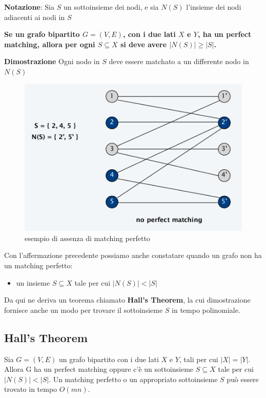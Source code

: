 \textbf{Notazione}: Sia $S$ un sottoinsieme dei nodi, e sia $N(S)$
l'insieme dei nodi adiacenti ai nodi in $S$

\begin{myblockquote}
\textbf{Se un grafo bipartito $G = (V, E)$, con i due lati $X$ e
$Y$, ha un perfect matching, allora per ogni $S \subseteq X$ si deve
avere $|N(S)| \ge |S|$.}
\end{myblockquote}

\textbf{Dimostrazione} Ogni nodo in $S$ deve essere matchato a un
differente nodo in $N(S)$\\

\begin{figure}[H]
    \centering
    \includegraphics[width = 10 cm]{Network_flow/imgs/bipartite2.png}
    \caption{esempio di assenza di matching perfetto}
\end{figure}

Con l'affermazione precedente possiamo anche constatare quando un grafo
non ha un matching perfetto:
\begin{itemize}
    \item un insieme $S \subseteq X$ tale per cui $|N(S)| < |S|$
\end{itemize}

Da qui ne deriva un teorema chiamato \textbf{Hall's Theorem}, la cui
dimostrazione fornisce anche un modo per trovare il sottoinsieme $S$
in tempo polinomiale.

\subsection{Hall's Theorem}

Sia $G=(V, E)$ un grafo bipartito con i due lati $X$ e $Y$, tali
per cui $|X| = |Y|$. Allora G ha un perfect matching oppure c'è un
sottoinsieme $S \subseteq X$ tale per cui $|N(S)| < |S|$. Un
matching perfetto o un appropriato sottoinsieme $S$ può essere trovato
in tempo $O(mn)$.\\

